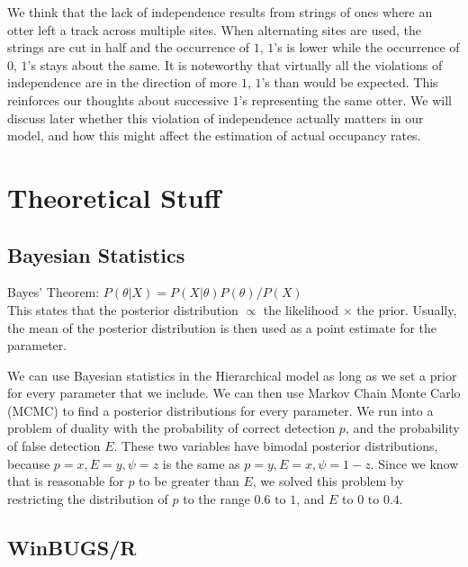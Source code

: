 \documentclass[12pt]{article}
\begin{document}

    We think that the lack of independence results from strings of ones where an
    otter left a track across multiple sites. When alternating sites are used,
    the strings are cut in half and the occurrence of \(1\), \(1\)'s is lower
    while the occurrence of \(0\), \(1\)'s stays about the same. It is
    noteworthy that virtually all the violations of independence are in the
    direction of more \(1\), \(1\)'s than would be expected. This reinforces our
    thoughts about successive \(1\)'s representing the same otter. We will
    discuss later whether this violation of independence actually matters in our
    model, and how this might affect the estimation of actual occupancy rates.

\section{Theoretical Stuff} 

    \subsection{Bayesian Statistics}
    Bayes' Theorem: \(P(\theta|X) = P(X|\theta)P(\theta) / P(X)\) \\

    This states that the posterior distribution \(\propto\) the likelihood
    \(\times\) the prior. Usually, the mean of the posterior distribution is
    then used as a point estimate for the parameter.

    We can use Bayesian statistics in the Hierarchical model as long as we set a
    prior for every parameter that we include. We can then use Markov Chain
    Monte Carlo (MCMC) to find a posterior distributions for every parameter. We
    run into a problem of duality with the probability of correct detection
    \(p\), and the probability of false detection \(E\). These two variables
    have bimodal posterior distributions, because \(p=x,E=y,\psi=z\) is the same
    as \(p=y,E=x,\psi=1-z\). Since we know that is reasonable for \(p\) to be
    greater than \(E\), we solved this problem by restricting the distribution
    of \(p\) to the range \(0.6\text{ to }1\), and \(E\) to \(0\text{ to }0.4\).

    \subsection{WinBUGS/R}
\end{document}
